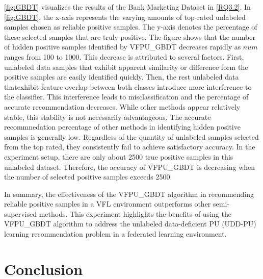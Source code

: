 \documentclass[10pt,journal,compsoc]{IEEEtran}
\begin{document}
\autoref{fig:GBDT} visualizes the results of the Bank Marketing Dataset in \autoref{RQ3.2}. In \autoref{fig:GBDT}, the x-axis represents the varying amounts of top-rated unlabeled samples chosen as reliable positive samples. The y-axis denotes the percentage of these selected samples that are truly positive. The figure shows that the number of hidden positive samples identified by VFPU\_GBDT decreases rapidly as $num$ ranges from 100 to 1000. This decrease is attributed to several factors. First, unlabeled data samples that exhibit apparent similarity or difference form the positive samples are easily identified quickly. Then, the rest unlabeled data thatexhibit feature overlap between both classes introduce more interference to the classifier. This interference leads to misclassification and the percentage of accurate recommendation decreases. While other methods appear relatively stable, this stability is not necessarily advantageous. The accurate recommnedation percentage of other methods in identifying hidden positive samples is generally low. Regardless of the quantity of unlabeled samples selected from the top rated, they consistently fail to achieve satisfactory accuracy. In the experiment setup, there are only about 2500 true positive samples in this unlabeled dataset. Therefore, the accuracy of VFPU\_GBDT is decreasing when the number of selected positive samples exceeds 2500.
 
In summary, the effectiveness of the VFPU\_GBDT algorithm in recommending reliable positive samples in a VFL environment outperforms other semi-supervised methods. This experiment highlights the benefits of using the VFPU\_GBDT algorithm to address the unlabeled data-deficient PU (UDD-PU) learning recommendation problem in a federated learning environment.




\section{Conclusion}
\label{sec5}
\end{document}
